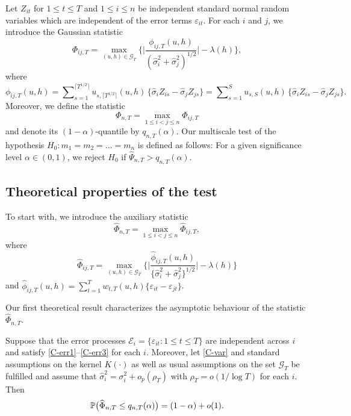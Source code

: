 \documentclass[a4paper,12pt]{article}
\begin{document}
Let $Z_{it}$ for $1 \le t \le T$ and $1 \le i \le n$ be independent standard normal random variables which are independent of the error terms $\varepsilon_{it}$. For each $i$ and $j$, we introduce the Gaussian statistic 
\[ \Phi_{ij,T} = \max_{(u,h) \in \mathcal{G}_T} \Big\{ \Big|\frac{\phi_{ij,T}(u,h)}{(\widehat{\sigma}_i^2 + \widehat{\sigma}_j^2)^{1/2}}\Big| - \lambda(h) \Big\}, \] 
where 
$$\phi_{ij,T}(u,h) = \sum\nolimits_{s=1}^{\lceil T^{1/2} \rceil} u_{s,\lceil T^{1/2} \rceil}(u,h) \, \{ \widehat{\sigma}_i Z_{is} - \widehat{\sigma}_j Z_{js} \} = \sum\nolimits_{s=1}^{S} u_{s,S}(u,h) \, \{ \widehat{\sigma}_i Z_{is} - \widehat{\sigma}_j Z_{js} \}.$$
Moreover, we define the statistic
\[ \Phi_{n,T} = \max_{1 \le i < j \le n} \Phi_{ij,T} \]
and denote its $(1-\alpha)$-quantile by $q_{n,T}(\alpha)$. Our multiscale test of the hypothesis $H_0: m_1 = m_2 = \ldots = m_n$ is defined as follows: For a given significance level $\alpha \in (0,1)$, we reject $H_0$ if $\widehat{\Psi}_{n,T} > q_{n,T}(\alpha)$. 


\subsection{Theoretical properties of the test}\label{subsec-test-equality-theo}


To start with, we introduce the auxiliary statistic 
\[ \widehat{\Phi}_{n,T} = \max_{1 \le i < j \le n} \widehat{\Phi}_{ij,T}, \]
where
\[ \widehat{\Phi}_{ij,T} = \max_{(u,h) \in \mathcal{G}_T} \Big\{ \Big| \frac{\widehat{\phi}_{ij,T}(u,h)} {\{ \widehat{\sigma}_i^2 + \widehat{\sigma}_j^2 \}^{1/2}} \Big| - \lambda(h) \Big \} \]
and $\widehat{\phi}_{ij,T}(u,h) = \sum_{t=1}^T w_{t,T}(u,h) \{ \varepsilon_{it} - \varepsilon_{jt} \}$.

Our first theoretical result characterizes the asymptotic behaviour of the statistic $\widehat{\Phi}_{n,T}$.
 
\begin{theorem}\label{theo-stat-equality}
Suppose that the error processes $\mathcal{E}_i = \{ \varepsilon_{it}: 1 \le t \le T \}$ are independent across $i$ and satisfy \ref{C-err1}--\ref{C-err3} for each $i$. Moreover, let \ref{C-var} and standard assumptions on the kernel $K(\cdot)$ as well as usual assumptions on the set $\mathcal{G}_T$ be fulfilled and assume that $\widehat{\sigma}_i^2 = \sigma_i^2 + o_p(\rho_T)$ with $\rho_T = o(1/\log T)$ for each $i$. Then 
\[ \mathbb{P} \big( \widehat{\Phi}_{n,T} \le q_{n,T}(\alpha) \big) = (1 - \alpha) + o(1). \]
\end{theorem}
\end{document}
